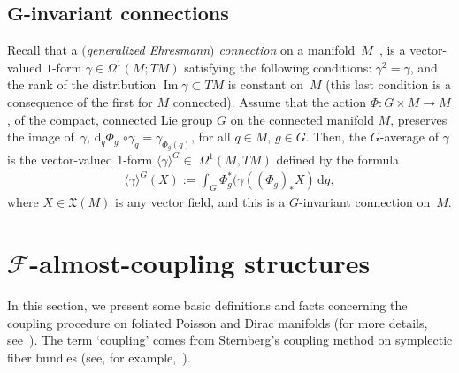 \documentclass[pdftex]{sigma}
\numberwithin{equation}{section}
\begin{document}
\subsection[$G$-invariant connections]{$\boldsymbol{G}$-invariant connections}
Recall that a \emph{$($generalized Ehresmann$)$ connection} on a manifold~$M$~\cite{KMS-93}, is a vector-valued $1$-form $\gamma\in\Omega^{1}(M;TM)$ satisfying the following conditions: $\gamma^{2}=\gamma$, and the rank of the distribution $\operatorname*{Im}\gamma\subset TM$ is constant on~$M$ (this last condition is a consequence of the f\/irst for $M$ connected). Assume that the action $\Phi\colon G\times M\rightarrow M$, of the compact, connected Lie group $G$ on the connected manifold $M$, preserves the image of~$\gamma$, $\mathrm{d}_{q}\Phi_{g}$ $\circ\gamma_{q}=\gamma_{\Phi_{g}(q)}$, for all $q\in M$, $g\in G$. Then, the $G$-average of $\gamma$ is the vector-valued $1$-form
$\langle \gamma \rangle^{G}\in$ $\Omega^{1}(M,TM)$ def\/ined by the formula
\begin{gather*}
\langle \gamma \rangle^{G}(X):= \int_{G}\Phi_{g}^{\ast}(\gamma((\Phi_{g})_{\ast}X)\,\mathrm{d}g,
\end{gather*}
where $X\in\mathfrak{X}(M)$ is any vector f\/ield, and this is a $G$-invariant connection on~$M$.

\section[$\mathcal{F}$-almost-coupling structures]{$\boldsymbol{\mathcal{F}}$-almost-coupling structures}

In this section, we present some basic def\/initions and facts concerning the coupling procedure on foliated Poisson and Dirac manifolds (for more details, see~\cite{Va-04,Va-06, Vo-01}). The term `coupling' comes from Sternberg's coupling method on symplectic f\/iber bundles (see, for
example,~\cite{GLS-96}).
\end{document}
